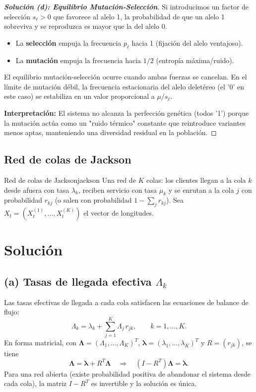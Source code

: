 \documentclass[10pt,a4paper]{article}
\begin{document}
\begin{proof}[\textbf{Solución (d): Equilibrio Mutación-Selección}]
    Si introducimos un factor de selección $s_\ell > 0$ que favorece al alelo 1, la probabilidad de que un alelo 1 sobreviva y se reproduzca es mayor que la del alelo 0. 
    \begin{itemize}
        \item La \textbf{selección} empuja la frecuencia $p_\ell$ hacia 1 (fijación del alelo ventajoso).
        \item La \textbf{mutación} empuja la frecuencia hacia $1/2$ (entropía máxima/ruido).
    \end{itemize}
    El equilibrio mutación-selección ocurre cuando ambas fuerzas se cancelan. En el límite de mutación débil, la frecuencia estacionaria del alelo deletéreo (el '0' en este caso) se estabiliza en un valor proporcional a $\mu/s_\ell$. 
    
    \textbf{Interpretación:} El sistema no alcanza la perfección genética (todos '1') porque la mutación actúa como un "ruido térmico" constante que reintroduce variantes menos aptas, manteniendo una diversidad residual en la población.
\end{proof}


\newpage

\subsection{Red de colas de Jackson}


\begin{ejercicio}{Red de colas de Jackson}{jackson}
Una red de \( K \) colas: los clientes llegan a la cola \( k \) desde afuera con tasa \( \lambda_k \), reciben servicio con tasa \( \mu_k \) y se enrutan a la cola \( j \) con probabilidad \( r_{kj} \) (o salen con probabilidad \( 1 - \sum_j r_{kj} \)).  
Sea \( X_t = (X_t^{(1)}, \ldots, X_t^{(K)}) \) el vector de longitudes.
\end{ejercicio}

\section*{Solución}

\subsection*{(a) Tasas de llegada efectiva \( \Lambda_k \)}
Las tasas efectivas de llegada a cada cola satisfacen las ecuaciones de balance de flujo:
\[
\Lambda_k = \lambda_k + \sum_{j=1}^{K} \Lambda_j \, r_{jk}, \qquad k = 1,\dots,K.
\]
En forma matricial, con \( \boldsymbol{\Lambda}=(\Lambda_1,\dots,\Lambda_K)^T \), \( \boldsymbol{\lambda}=(\lambda_1,\dots,\lambda_K)^T \) y \( R=(r_{jk}) \), se tiene
\[
\boldsymbol{\Lambda} = \boldsymbol{\lambda} + R^T \boldsymbol{\Lambda}
\quad\Longrightarrow\quad (I - R^T)\boldsymbol{\Lambda} = \boldsymbol{\lambda}.
\]
Para una red abierta (existe probabilidad positiva de abandonar el sistema desde cada cola), la matriz \( I-R^T \) es invertible y la solución es única.
\end{document}
